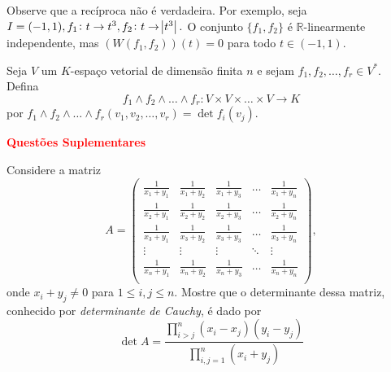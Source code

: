 \documentclass[11pt,a4paper]{article}
\begin{document}
Observe que a recíproca não é verdadeira. Por exemplo, seja $ I = (-1, 1), f_1  \colon t \to t^3, f_2 \colon t \to \abs{t^3}.$ O conjunto $\{ f_1, f_2 \}$ é $\mathbb{R}$-linearmente independente, mas $(W(f_1, f_2))(t) = 0$ para todo $t \in (-1, 1).$

\solucao{}

 Seja $V$ um $K$-espaço vetorial de dimensão finita $n$ e sejam $f_1, f_2, \ldots, f_r \in V^{*}.$ Defina
\[f_1 \wedge f_2 \wedge \ldots \wedge f_r \colon V \times V \times \ldots \times V \to K\]
por $f_1 \wedge f_2 \wedge \ldots \wedge f_r (v_1, v_2, \ldots, v_r) = \det f_i(v_j).$
    
    \solucao{}


\textbf{\textcolor{Red}{Questões Suplementares}}


 Considere a matriz
\[
A = \left(\begin{array}{ccccc} \frac{1}{x_1 + y_1} & \frac{1}{x_1 + y_2} & \frac{1}{x_1 + y_3} & \ldots & \frac{1}{x_1 + y_n} \\
\frac{1}{x_2 + y_1} & \frac{1}{x_2 + y_2} & \frac{1}{x_2 + y_3} & \ldots & \frac{1}{x_2 + y_n} \\
\frac{1}{x_3 + y_1} & \frac{1}{x_3 + y_2} & \frac{1}{x_3 + y_3} & \ldots & \frac{1}{x_3 + y_n} \\
\vdots & \vdots & \vdots & \ddots & \vdots \\
\frac{1}{x_n + y_1} & \frac{1}{x_n + y_2} & \frac{1}{x_n + y_3} & \ldots & \frac{1}{x_n + y_n} \\
\end{array} \right),
\]
onde $x_i + y_j \neq 0$ para $1 \le i,j \le n.$ Mostre que o determinante dessa matriz, conhecido por \emph{determinante de Cauchy}, é dado por
\[
\det A = \frac{\prod\limits_{i > j}^n (x_i - x_j)(y_i - y_j)}{\prod\limits_{i,j = 1}^n (x_i + y_j)}
\]
\solucao{}
\end{document}
